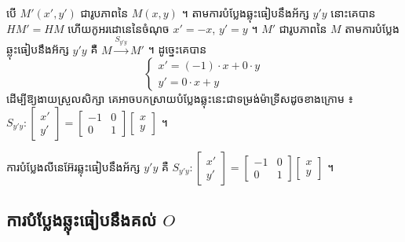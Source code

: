 \begin{center}
\end{center}

បើ $M'(x', y')$ ជារូបភាពនៃ $M(x, y)$ ។ តាមការបំប្លែងឆ្លុះធៀបនឹងអ័ក្ស $y'y$ នោះគេបាន $HM' = HM$ ហើយកូអរដោនេនៃចំណុច $x' = -x$, $y' = y$ ។ $M'$ ជារូបភាពនៃ $M$ តាមការបំប្លែងឆ្លុះធៀបនឹងអ័ក្ស $y'y$ គឺ $M \xrightarrow{S_{y'y}} M'$ ។ ដូច្នេះគេបាន
\[ \begin{cases} x' = (-1)\cdot x + 0\cdot y\\ y' = 0\cdot x + y \end{cases} \]
ដើម្បីឱ្យងាយស្រួលសិក្សា គេអាចបកស្រាយបំប្លែងឆ្លុះនេះជាទម្រង់ម៉ាទ្រីសដូចខាងក្រោម ៖ $S_{y'y} : \begin{bmatrix} x'\\ y' \end{bmatrix} = \begin{bmatrix} -1 & 0\\ 0 & 1 \end{bmatrix}\begin{bmatrix} x\\ y \end{bmatrix}$ ។

\begin{formulaBox}[ជាទូទៅ]
ការបំប្លែងលីនេអ៊ែរឆ្លុះធៀបនឹងអ័ក្ស $y'y$ គឺ $S_{y'y} : \begin{bmatrix} x'\\ y' \end{bmatrix} = \begin{bmatrix} -1 & 0\\ 0 & 1 \end{bmatrix}\begin{bmatrix} x\\ y \end{bmatrix}$ ។
\end{formulaBox}

\subsection{ការបំប្លែងឆ្លុះធៀបនឹងគល់ \texorpdfstring{$O$}{O}}

